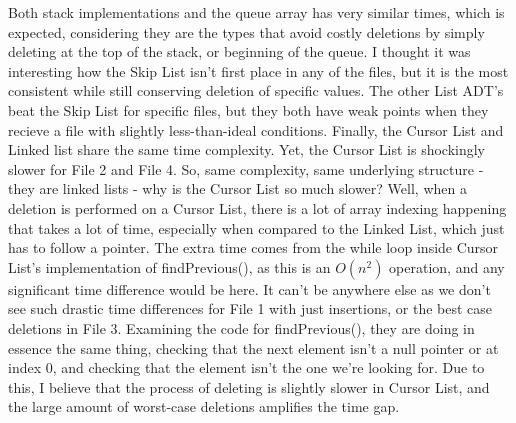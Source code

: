 \documentclass[12pt]{article}
\begin{document}
\begin{doublespace}
    Both stack implementations and the queue array has very similar times, which is expected, considering they are the types that avoid costly deletions by simply deleting at the top of the stack, or beginning of the queue. I thought it was interesting how the Skip List isn't first place in any of the files, but it is the most consistent while still conserving deletion of specific values. The other List ADT's beat the Skip List for specific files, but they both have weak points when they recieve a file with slightly less-than-ideal conditions. Finally, the Cursor List and Linked list share the same time complexity. Yet, the Cursor List is shockingly slower for File 2 and File 4. So, same complexity, same underlying structure - they are linked lists - why is the Cursor List so much slower? Well, when a deletion is performed on a Cursor List, there is a lot of array indexing happening that takes a lot of time, especially when compared to the Linked List, which just has to follow a pointer. The extra time comes from the while loop inside Cursor List's implementation of findPrevious(), as this is an $O(n^2)$ operation, and any significant time difference would be here. It can't be anywhere else as we don't see such drastic time differences for File 1 with just insertions, or the best case deletions in File 3. Examining the code for findPrevious(), they are doing in essence the same thing, checking that the next element isn't a null pointer or at index 0, and checking that the element isn't the one we're looking for. Due to this, I believe that the process of deleting is slightly slower in Cursor List, and the large amount of worst-case deletions amplifies the time gap.
    
\end{doublespace}
\end{document}
